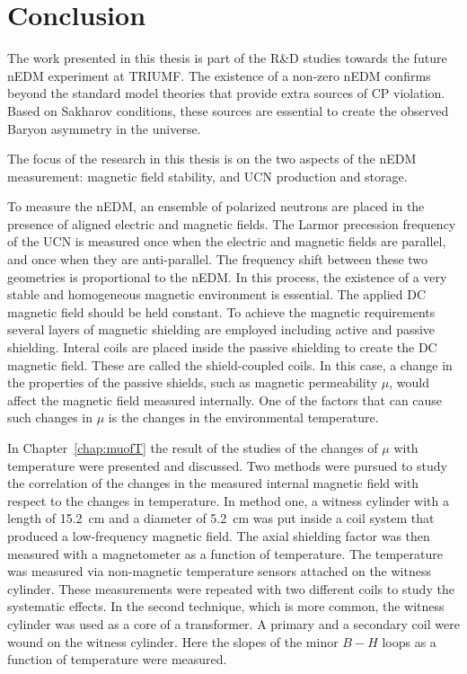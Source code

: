 \chapter{Conclusion\label{chap:overall}}


The work presented in this thesis is part of the R\&D studies towards
the future nEDM experiment at TRIUMF. The existence of a non-zero nEDM
confirms beyond the standard model theories that provide extra sources
of CP violation. Based on Sakharov conditions, these sources are
essential to create the observed Baryon asymmetry in the universe.

The focus of the research in this thesis is on the two aspects of the
nEDM measurement: magnetic field stability, and UCN production and
storage.

To measure the nEDM, an ensemble of polarized neutrons are placed in
the presence of aligned electric and magnetic fields. The Larmor
precession frequency of the UCN is measured once when the electric and
magnetic fields are parallel, and once when they are anti-parallel. The
frequency shift between these two geometries is proportional to the
nEDM. In this process, the existence of a very stable and homogeneous
magnetic environment is essential. The applied DC magnetic field
should be held constant. To achieve the magnetic requirements several
layers of magnetic shielding are employed including active and passive
shielding. Interal coils are placed inside the passive shielding to
create the DC magnetic field. These are called the shield-coupled
coils. In this case, a change in the properties of the passive
shields, such as magnetic permeability $\mu$, would affect the
magnetic field measured internally. One of the factors that can cause
such changes in $\mu$ is the changes in the environmental temperature.

In Chapter~\ref{chap:muofT} the result of the studies of the changes
of $\mu$ with temperature were presented and discussed. Two methods
were pursued to study the correlation of the changes in the measured
internal magnetic field with respect to the changes in temperature. In
method one, a witness cylinder with a length of 15.2~cm and a diameter
of 5.2~cm was put inside a coil system that produced a low-frequency
magnetic field. The axial shielding factor was then measured with a
magnetometer as a function of temperature. The temperature was
measured via non-magnetic temperature sensors attached on the witness
cylinder. These measurements were repeated with two different coils to
study the systematic effects. In the second technique, which is more
common, the witness cylinder was used as a core of a transformer. A
primary and a secondary coil were wound on the witness cylinder. Here
the slopes of the minor $B-H$ loops as a function of temperature were
measured.

